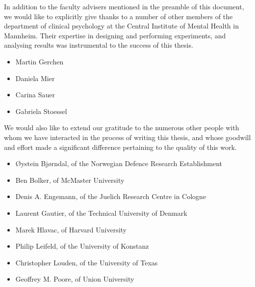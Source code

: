 In addition to the faculty advisers mentioned in the preamble of this document, we would like to explicitly give thanks to a number of other members of the department of clinical psychology at the Central Institute of Mental Health in Mannheim.
Their expertise in designing and performing experiments, and analysing results was instrumental to the success of this thesis.
\begin{multicols}{2}
    \begin{itemize}
	\item Martin Gerchen
	\item Daniela Mier
	\item Carina Sauer
	\item Gabriela Stoessel
    \end{itemize}
\end{multicols}
\vspace{0.5cm}
We would also like to extend our gratitude to the numerous other people with whom we have interacted in the process of writing this thesis, and whose goodwill and effort made a significant difference pertaining to the quality of this work.
\begin{itemize}
    \item Øystein Bjørndal, of the Norwegian Defence Research Establishment
    \item Ben Bolker, of McMaster University
    \item Denis A. Engemann, of the Juelich Research Centre in Cologne
    \item Laurent Gautier, of the Technical University of Denmark
    \item Marek Hlavac, of Harvard University
    \item Philip Leifeld, of the University of Konstanz
    \item Christopher Louden, of the University of Texas
    \item Geoffrey M. Poore, of Union University
\end{itemize}
